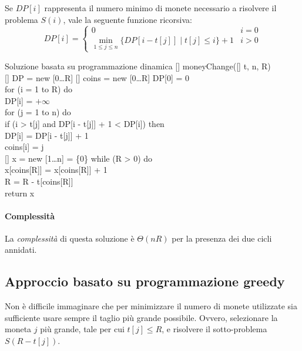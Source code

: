 \noindent
Se $DP[i]$ rappresenta il numero minimo di monete necessario a risolvere il
problema $S(i)$, vale la seguente funzione ricorsiva:
\[DP[i]=\begin{cases}
    0 & i=0\\
    \min_{1\leq j\leq n}\{DP[i-t[j]]\;|\;t[j]\leq i\}+1 & i>0
\end{cases}\]

\begin{minicode}{Soluzione basata su programmazione dinamica}
\ind{}[] moneyChange([] t,  n,  R)\\
    [] DP = new [0\dots R]\hfill{}
    [] coins = new [0\dots R]\hfill{}
    DP[0] = 0\\
    \indf for (i = 1 to R) do\\
        DP[i] = $+\infty$\\
        \indff for (j = 1 to n) do\\
            \indfff if (i > t[j] and DP[i - t[j]] + 1 < DP[i]) then\\
                DP[i] = DP[i - t[j]] + 1\\
                coins[i] = j\\
    \indf{}
    \indf{}[] x = new [1\dots n] = \{0\}\hfill{}
    \indf while (R > 0) do\\
        x[coins[R]] = x[coins[R]] + 1\\
        R = R - t[coins[R]]\\
    \indf return x
\end{minicode}

\paragraph{Complessità}
La \emph{complessità} di questa soluzione è $\Theta(nR)$ per la presenza dei
due cicli annidati.

\subsection{Approccio basato su programmazione greedy}
Non è difficile immaginare che per minimizzare il numero di monete utilizzate
sia sufficiente usare sempre il taglio più grande possibile. Ovvero, selezionare
la moneta $j$ più grande, tale per cui $t[j]\leq R$, e risolvere il sotto-problema
$S(R-t[j])$.

